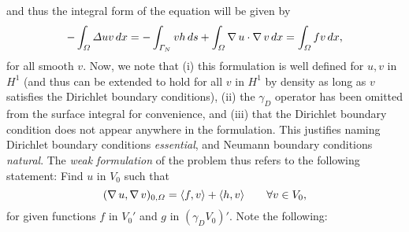 and thus the integral form of the equation will be given by
    \begin{equation*}
-\int_\Omega\Delta u v\,dx = -\int_{\Gamma_N}v h\,ds + \int_\Omega \operatorname{\nabla} u \cdot \operatorname{\nabla} v\,dx = \int_\Omega f v\,dx,
\end{equation*}
for all smooth $v$. Now, we note that (i) this formulation is well defined for $u,v$ in $H^1$ (and thus can be extended to hold for all $v$ in $H^1$ by density as long as $v$ satisfies the Dirichlet boundary conditions), (ii) the $\gamma_D$ operator has been omitted from the surface integral for convenience, and (iii) that the Dirichlet boundary condition does not appear anywhere in the formulation. This justifies naming Dirichlet boundary conditions \emph{essential}, and Neumann boundary conditions \emph{natural}. The \emph{weak formulation} of the problem thus refers to the following statement: Find $u$ in $V_0$ such that
    \begin{equation*}
(\operatorname{\nabla} u, \operatorname{\nabla} v)_{0,\Omega} = \langle f, v\rangle  + \langle h,  v\rangle \qquad \forall v\in V_0,
\end{equation*}
for given functions $f$ in $V_0'$ and $g$ in $(\gamma_D V_0)'$. Note the following: 
